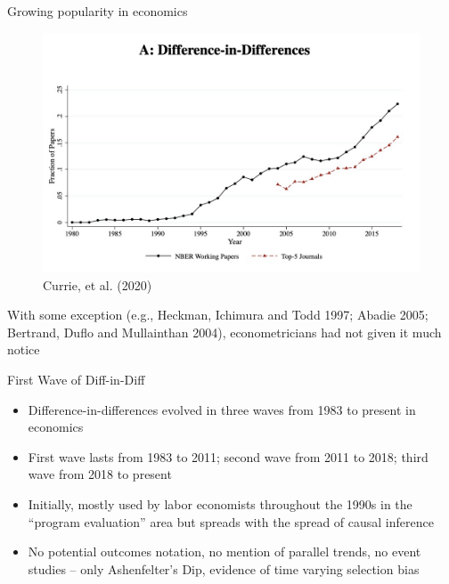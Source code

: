 \documentclass{beamer}
\begin{document}
\begin{frame}{Growing popularity in economics}

	\begin{figure}
	\caption{Currie, et al. (2020)}
	\includegraphics[scale=0.25]{./lecture_includes/currie_did.png}
	\end{figure}

\bigskip

\footnotesize

With some exception (e.g., Heckman, Ichimura and Todd 1997; Abadie 2005; Bertrand, Duflo and Mullainthan 2004), econometricians had not given it much notice

\end{frame}



\begin{frame}{First Wave of Diff-in-Diff}

\begin{itemize}
\item Difference-in-differences evolved in three waves from 1983 to present in economics
\item First wave lasts from 1983 to 2011; second wave from 2011 to 2018; third wave from 2018 to present
\item Initially, mostly used by labor economists throughout the 1990s in the ``program evaluation'' area but spreads with the spread of causal inference 
\item No potential outcomes notation, no mention of parallel trends, no event studies -- only Ashenfelter's Dip, evidence of time varying selection bias

\end{itemize}

\end{frame}
\end{document}
